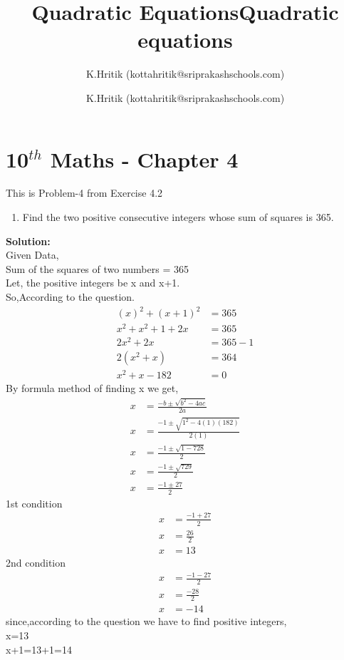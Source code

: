 \documentclass[12pt]{article}
\title{Quadratic Equations}
\author{ K.Hritik (kottahritik@sriprakashschools.com)}
\title{Quadratic equations}
\author{K.Hritik (kottahritik@sriprakashschools.com)}
\newcommand{\solution}{\noindent \textbf{Solution: }}
\begin{document}
\maketitle
\section*{10$^{th}$ Maths - Chapter 4}
This is Problem-4 from Exercise 4.2
\begin{enumerate}
\item Find the two positive consecutive integers whose sum of squares is 365.
\end{enumerate}
\solution \\
Given Data,\\
Sum of the squares of two numbers = 365\\
Let, the positive integers be x and x+1.\\
So,According to the question.
\begin{align}
(x)^{2} + (x+1)^{2} &= 365 \\
x^{2} + x^{2} + 1 + 2x &= 365 \\
2x^{2} +2x &= 365 -1\\
2(x^{2} +x) &= 364\\
x^{2} + x - 182 &= 0
\end{align}
By formula method of finding x we get,\\
\begin{align}
x &= \frac{-b\pm\sqrt{b^2-4ac}}{2a}\\
x &= \frac{-1\pm\sqrt{1^2-4(1)(182)}}{2(1)}\\
x &= \frac{-1 \pm\sqrt{1-728}}{2}\\
x &= \frac{-1 \pm\sqrt{729}}{2}\\
x &= \frac{-1 \pm 27}{2}
\end{align}
1st condition
\begin{align}
x &=\frac{-1 + 27}{2}\\
x &=\frac{26}{2}\\ 
x &=13
\end{align}
2nd condition 
\begin{align}
x &= \frac{-1 - 27}{2}\\
x &=\frac{-28}{2}\\
x &= -14
\end{align}
since,according to the question we have to find positive integers,\\
x=13\\
x+1=13+1=14\\
\end{document}

